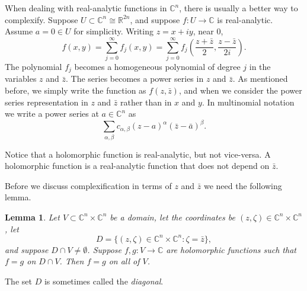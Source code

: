 \documentclass[12pt,openany]{book}
\newcommand{\C}{{\mathbb{C}}}
\newcommand{\R}{{\mathbb{R}}}
\newcommand{\myindex}[1]{#1\index{#1}}
\theoremstyle{plain}
\newtheorem{lemma}[thm]{Lemma}
\theoremstyle{remark}
\theoremstyle{definition}
\theoremstyle{exercise}
\theoremstyle{example}
\begin{document}
When dealing with real-analytic functions in $\C^n$, there is usually a better
way to complexify.
Suppose $U \subset \C^n \cong \R^{2n}$, and suppose $f \colon U \to
\C$ is real-analytic.  Assume $a=0 \in U$ for simplicity.
Writing $z = x+iy$, near $0$,
\begin{equation*}
f(x,y)
= 
\sum_{j=0}^\infty
f_j(x,y)
= 
\sum_{j=0}^\infty
f_j\left(
\frac{z+\bar{z}}{2},
\frac{z-\bar{z}}{2i}\right) .
\end{equation*}
The polynomial $f_j$ becomes a homogeneous polynomial of degree $j$
in the variables $z$ and $\bar{z}$.  The 
series becomes a power series in $z$ and $\bar{z}$.  As mentioned before,
we simply write the function as $f(z,\bar{z})$, and when we consider the
power series representation in $z$ and $\bar{z}$ rather than
in $x$ and $y$.
In multinomial notation we write a power series at $a \in \C^n$ as
\begin{equation*}
\sum_{\alpha,\beta} c_{\alpha,\beta} {(z-a)}^\alpha
{(\bar{z}-\bar{a})}^\beta .
\end{equation*}

Notice that a holomorphic function
is real-analytic, but not vice-versa.  A holomorphic function
is a real-analytic function that does not depend on $\bar{z}$.

Before we discuss complexification in terms of $z$ and $\bar{z}$ we need
the following lemma.

\begin{lemma}
Let $V \subset \C^n \times \C^n$ be a domain, let the coordinates be $(z,\zeta) \in \C^n \times
\C^n$, let
\begin{equation*}
D = \bigl\{ (z,\zeta) \in \C^n \times \C^n : \zeta = \bar{z} \bigr\},
\end{equation*}
and suppose $D \cap V \not= \emptyset$.
Suppose $f,g \colon V \to \C$ are holomorphic functions such that
$f=g$ on $D \cap V$.  Then $f=g$ on all of $V$.
\end{lemma}

The set $D$ is sometimes called the \emph{\myindex{diagonal}}.
\end{document}
